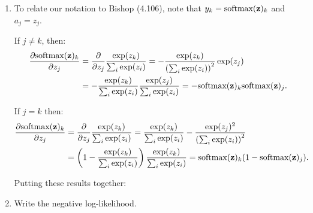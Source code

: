 \documentclass[12pt,letterpaper]{article}
\begin{document}
\begin{enumerate}
\begin{enumerate}
  
          
            \item To relate our notation to Bishop (4.106), note that $y_k = \text{softmax}({\bf z})_k$ and $a_j = z_j$. 
            
            If $j\neq k$, then:
            \begin{align*}
            \frac{\partial \text{softmax}({\bf z})_k}{\partial z_j} &= \frac{\partial}{\partial z_j} \frac{\exp(z_k)}{\sum_i \exp(z_i)} = - \frac{\exp(z_k)}{\left(\sum_i \exp(z_i)\right)^2}\exp(z_j)\\& = -\frac{\exp(z_k)}{\sum_i \exp(z_i)} \frac{\exp(z_j)}{\sum_i \exp(z_i)} = -\text{softmax}({\bf z})_k \text{softmax}({\bf z})_j.
            \end{align*}
            
            If $j = k$ then:
            \begin{align*}
            \frac{\partial \text{softmax}({\bf z})_k}{\partial z_j} &= \frac{\partial}{\partial z_j} \frac{\exp(z_k)}{\sum_i \exp(z_i)} = \frac{\exp(z_k)}{\sum_i \exp(z_i)} - \frac{\exp(z_j)^2}{\left(\sum_i \exp(z_i)\right)^2}  \\&= \left(1 - \frac{\exp(z_k)}{\sum_i \exp(z_i)}\right)\frac{\exp(z_k)}{\sum_i \exp(z_i)} = \text{softmax}({\bf z})_k(1 - \text{softmax}({\bf z})_j).
            \end{align*}
            
            Putting these results together:
            
            
            \item  Write the negative log-likelihood.
            

\end{enumerate}
\end{enumerate}
\end{document}
